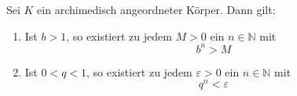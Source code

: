 Sei $K$ ein archimedisch angeordneter Körper. Dann gilt:
\begin{enumerate}[label=\alph*)]
    \item Ist $b > 1$, so existiert zu jedem $M > 0$ ein $n \in \mathbb{N}$ mit
    $$b^n > M$$
    \item Ist $0 < q < 1$, so existiert zu jedem $\varepsilon > 0$ ein $n \in \mathbb{N}$ mit
   $$q^n < \varepsilon$$
\end{enumerate}